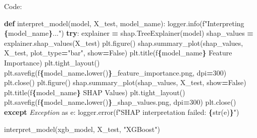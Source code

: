 \documentclass[preprint, 3p,
authoryear]{elsarticle} %
\newenvironment{Shaded}{\begin{snugshade}}{\end{snugshade}}
\newcommand{\BuiltInTok}[1]{#1}
\newcommand{\ControlFlowTok}[1]{\textcolor[rgb]{0.13,0.29,0.53}{\textbf{#1}}}
\newcommand{\DecValTok}[1]{\textcolor[rgb]{0.00,0.00,0.81}{#1}}
\newcommand{\ImportTok}[1]{#1}
\newcommand{\KeywordTok}[1]{\textcolor[rgb]{0.13,0.29,0.53}{\textbf{#1}}}
\newcommand{\NormalTok}[1]{#1}
\newcommand{\OperatorTok}[1]{\textcolor[rgb]{0.81,0.36,0.00}{\textbf{#1}}}
\newcommand{\PreprocessorTok}[1]{\textcolor[rgb]{0.56,0.35,0.01}{\textit{#1}}}
\newcommand{\SpecialCharTok}[1]{\textcolor[rgb]{0.81,0.36,0.00}{\textbf{#1}}}
\newcommand{\SpecialStringTok}[1]{\textcolor[rgb]{0.31,0.60,0.02}{#1}}
\newcommand{\StringTok}[1]{\textcolor[rgb]{0.31,0.60,0.02}{#1}}
\newcommand{\VariableTok}[1]{\textcolor[rgb]{0.00,0.00,0.00}{#1}}
\begin{document}
Code:

\begin{Shaded}
\begin{Highlighting}[]
\KeywordTok{def}\NormalTok{ interpret\_model(model, X\_test, model\_name):}
\NormalTok{    logger.info(}\SpecialStringTok{f"Interpreting }\SpecialCharTok{\{}\NormalTok{model\_name}\SpecialCharTok{\}}\SpecialStringTok{..."}\NormalTok{)}
    \ControlFlowTok{try}\NormalTok{:}
\NormalTok{        explainer }\OperatorTok{=}\NormalTok{ shap.TreeExplainer(model)}
\NormalTok{        shap\_values }\OperatorTok{=}\NormalTok{ explainer.shap\_values(X\_test)}
\NormalTok{        plt.figure()}
\NormalTok{        shap.summary\_plot(shap\_values, X\_test, plot\_type}\OperatorTok{=}\StringTok{"bar"}\NormalTok{, show}\OperatorTok{=}\VariableTok{False}\NormalTok{)}
\NormalTok{        plt.title(}\SpecialStringTok{f\textquotesingle{}}\SpecialCharTok{\{}\NormalTok{model\_name}\SpecialCharTok{\}}\SpecialStringTok{ Feature Importance\textquotesingle{}}\NormalTok{)}
\NormalTok{        plt.tight\_layout()}
\NormalTok{        plt.savefig(}\SpecialStringTok{f\textquotesingle{}}\SpecialCharTok{\{}\NormalTok{model\_name}\SpecialCharTok{.}\NormalTok{lower()}\SpecialCharTok{\}}\SpecialStringTok{\_feature\_importance.png\textquotesingle{}}\NormalTok{, dpi}\OperatorTok{=}\DecValTok{300}\NormalTok{)}
\NormalTok{        plt.close()}
\NormalTok{        plt.figure()}
\NormalTok{        shap.summary\_plot(shap\_values, X\_test, show}\OperatorTok{=}\VariableTok{False}\NormalTok{)}
\NormalTok{        plt.title(}\SpecialStringTok{f\textquotesingle{}}\SpecialCharTok{\{}\NormalTok{model\_name}\SpecialCharTok{\}}\SpecialStringTok{ SHAP Values\textquotesingle{}}\NormalTok{)}
\NormalTok{        plt.tight\_layout()}
\NormalTok{        plt.savefig(}\SpecialStringTok{f\textquotesingle{}}\SpecialCharTok{\{}\NormalTok{model\_name}\SpecialCharTok{.}\NormalTok{lower()}\SpecialCharTok{\}}\SpecialStringTok{\_shap\_values.png\textquotesingle{}}\NormalTok{, dpi}\OperatorTok{=}\DecValTok{300}\NormalTok{)}
\NormalTok{        plt.close()}
    \ControlFlowTok{except} \PreprocessorTok{Exception} \ImportTok{as}\NormalTok{ e:}
\NormalTok{        logger.error(}\SpecialStringTok{f"SHAP interpretation failed: }\SpecialCharTok{\{}\BuiltInTok{str}\NormalTok{(e)}\SpecialCharTok{\}}\SpecialStringTok{"}\NormalTok{)}

\NormalTok{interpret\_model(xgb\_model, X\_test, }\StringTok{"XGBoost"}\NormalTok{)}
\end{Highlighting}
\end{Shaded}
\end{document}
